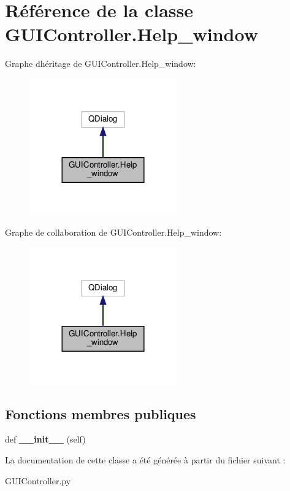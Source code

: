 \hypertarget{classGUIController_1_1Help__window}{}\section{Référence de la classe G\+U\+I\+Controller.\+Help\+\_\+window}
\label{classGUIController_1_1Help__window}


Graphe d\textquotesingle{}héritage de G\+U\+I\+Controller.\+Help\+\_\+window\+:
\nopagebreak
\begin{figure}[H]
\begin{center}
\leavevmode
\includegraphics[width=180pt]{classGUIController_1_1Help__window__inherit__graph}
\end{center}
\end{figure}


Graphe de collaboration de G\+U\+I\+Controller.\+Help\+\_\+window\+:
\nopagebreak
\begin{figure}[H]
\begin{center}
\leavevmode
\includegraphics[width=180pt]{classGUIController_1_1Help__window__coll__graph}
\end{center}
\end{figure}
\subsection*{Fonctions membres publiques}
\begin{DoxyCompactItemize}
\item 
\mbox{\label{classGUIController_1_1Help__window_a3eec53a272fddecd02b59ae8ce7717be}} 
def {\bfseries \+\_\+\+\_\+init\+\_\+\+\_\+} (self)
\end{DoxyCompactItemize}


La documentation de cette classe a été générée à partir du fichier suivant \+:\begin{DoxyCompactItemize}
\item 
G\+U\+I\+Controller.\+py\end{DoxyCompactItemize}
